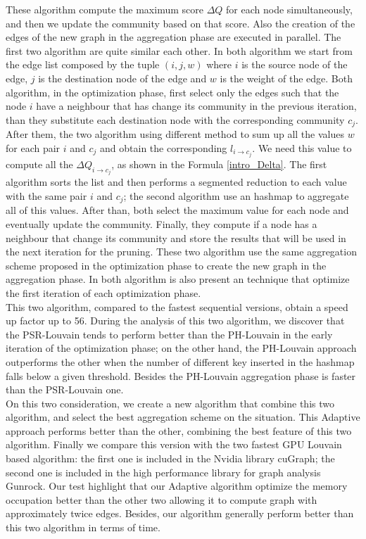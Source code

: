 These algorithm compute the maximum score $\Delta Q$ for each node simultaneously, and then we update the community based on that score. Also the creation of the edges of the new graph in the aggregation phase are executed in parallel. 
The first two algorithm are quite similar each other. In both algorithm we start from the edge list composed by the tuple $(i,j,w)$ where $i$ is the source node of the edge, $j$ is the destination node of the edge and $w$ is the weight of the edge.
Both algorithm, in the optimization phase, first select only the edges such that the node $i$ have a neighbour that has change its community in the previous iteration, than they substitute each destination node with the corresponding community $c_j$. After them, the two algorithm using different method to sum up all the values $w$ for each pair $i$ and $c_j$ and obtain the corresponding $l_{i\rightarrow c_j}$. We need this value to compute all the $\Delta Q_{i \rightarrow c_j}$, as shown in the Formula \ref{intro_Delta}. The first algorithm sorts the list and then performs a segmented reduction to each value with the same pair $i$ and $c_j$; the second algorithm use an hashmap to aggregate all of this values. After than, both select the maximum value for each node and eventually update the community. Finally, they compute if a node has a neighbour that change its community and store the results that will be used in the next iteration for the pruning. These two algorithm use the same aggregation scheme proposed in the optimization phase to create the new graph in the aggregation phase. In both algorithm is also present an technique that optimize the first iteration of each optimization phase. \\
This two algorithm, compared to the fastest sequential versions, obtain a speed up factor up to 56.
During the analysis of this two algorithm, we discover that the PSR-Louvain tends to perform better than the PH-Louvain in the early iteration of the optimization phase; on the other hand, the PH-Louvain approach outperforms the other when the number of different key inserted in the hashmap falls below a given threshold. Besides the PH-Louvain aggregation phase is faster than the PSR-Louvain one. \\
On this two consideration, we create a new algorithm that combine this two algorithm, and select the best aggregation scheme on the situation. This Adaptive approach performs better than the other, combining the best feature of this two algorithm. Finally we compare this version with the two fastest GPU Louvain based algorithm: the first one is included in the Nvidia library cuGraph; the second one is included in the high performance library for graph analysis Gunrock. Our test highlight that our Adaptive algorithm optimize the memory occupation better than the other two allowing it to compute graph with approximately twice edges. Besides, our algorithm generally perform better than this two algorithm in terms of time.\\
